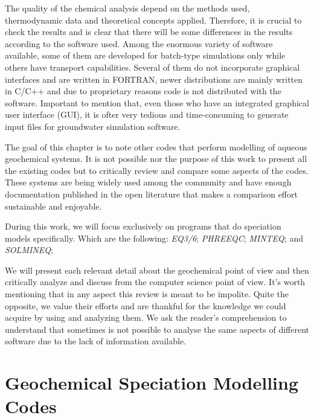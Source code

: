 \documentclass[ppgc,mestrado,English]{iiufrgs}
\begin{document}
The quality of the chemical analysis depend on the methods used, thermodynamic data and theoretical concepts applied. Therefore, it is crucial to check the results and is clear that there will be some differences in the results according to the software used. Among the enormous variety of software available, some of them are developed for batch-type simulations only while others have transport capabilities. Several of them do not incorporate graphical interfaces and are written in FORTRAN, newer distributions are mainly written in C/C++ and due to proprietary reasons code is not distributed with the software. Important to mention that, even those who have an integrated graphical user interface (GUI), it is ofter very tedious and time-consuming to generate input files for groundwater simulation software.

The goal of this chapter is to note other codes that perform modelling of aqueous geochemical systems. It is not possible nor the purpose of this work to present all the existing codes but to critically review and compare some aspects of the codes. These systems are being widely used among the community and have enough documentation published in the open literature that makes a comparison effort sustainable and enjoyable.

During this work, we will focus exclusively on programs that do speciation models specifically. Which are the following: \emph{EQ3/6}; \emph{PHREEQC}; \emph{MINTEQ}; and \emph{SOLMINEQ};

We will present each relevant detail about the geochemical point of view and then critically analyze and discuss from the computer science point of view. It's worth mentioning that in any aspect this review is meant to be impolite. Quite the opposite, we value their efforts and are thankful for the knowledge we could acquire by using and analyzing them. We ask the reader's comprehension to understand that sometimes is not possible to analyse the same aspects of different software due to the lack of information available.


\section{Geochemical Speciation Modelling Codes}

\end{document}
